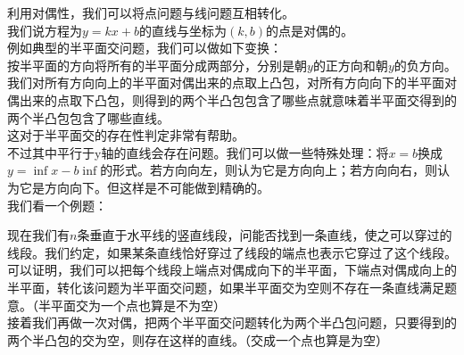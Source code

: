 利用对偶性，我们可以将点问题与线问题互相转化。 \\
我们说方程为$y=kx+b$的直线与坐标为$(k,b)$的点是对偶的。 \\

例如典型的半平面交问题，我们可以做如下变换： \\
按半平面的方向将所有的半平面分成两部分，分别是朝$y$的正方向和朝$y$的负方向。 \\
我们对所有方向向上的半平面对偶出来的点取上凸包，对所有方向向下的半平面对偶出来的点取下凸包，则得到的两个半凸包包含了哪些点就意味着半平面交得到的两个半凸包包含了哪些直线。 \\
这对于半平面交的存在性判定非常有帮助。 \\
不过其中平行于y轴的直线会存在问题。我们可以做一些特殊处理：将$x=b$换成$y=\inf x-b\inf$的形式。若方向向左，则认为它是方向向上；若方向向右，则认为它是方向向下。但这样是不可能做到精确的。 \\

我们看一个例题：

现在我们有$n$条垂直于水平线的竖直线段，问能否找到一条直线，使之可以穿过的线段。我们约定，如果某条直线恰好穿过了线段的端点也表示它穿过了这个线段。 \\

可以证明，我们可以把每个线段上端点对偶成向下的半平面，下端点对偶成向上的半平面，转化该问题为半平面交问题，如果半平面交为空则不存在一条直线满足题意。（半平面交为一个点也算是不为空） \\
接着我们再做一次对偶，把两个半平面交问题转化为两个半凸包问题，只要得到的两个半凸包的交为空，则存在这样的直线。（交成一个点也算是为空） \\


